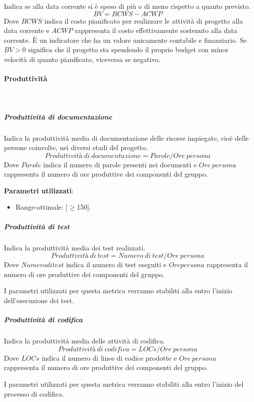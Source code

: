 			Indica se alla data corrente si è speso di più o di meno rispetto a quanto previsto.
			\[
			BV = BCWS - ACWP
			\]
			Dove $BCWS$ indica il costo pianificato per realizzare le attività di  progetto alla  data corrente e $ACWP$ rappresenta il costo effettivamente sostenuto alla data  corrente.
			È un indicatore che ha un valore unicamente contabile e finanziario. Se $BV>0$ significa che il progetto sta spendendo il proprio budget con minor velocità di quanto pianificato, viceversa se negativo.

			\paragraph{Produttività} \mbox{} \\

				\subparagraph{Produttività di documentazione}
				Indica la produttività media di documentazione delle risorse impiegate, cioè delle persone coinvolte, nei diversi stadi del progetto.
				\[
				Produttività\ di\ documentazione = Parole / Ore\ persona
				\]
				Dove $Parole$ indica il numero di parole presenti nei documenti e $Ore\ persona$ rappresenta il numero di ore produttive dei componenti del gruppo.
				
				\textbf{Parametri utilizzati}:
				\begin{itemize}
					\item Range-ottimale: [$\ge$150].
				\end{itemize}

				\subparagraph{Produttività di test}
				Indica la produttività media dei test realizzati.
				\[
				Produttività\ di\ test = Numero\ di\ test / Ore\ persona
				\]
				Dove $Numero di test$ indica il numero di test eseguiti e $Ore persona$ rappresenta il numero di ore produttive dei componenti del gruppo.
				
				I parametri utilizzati per questa metrica verranno stabiliti alla entro l'inizio dell'esecuzione dei test.

				\subparagraph{Produttività di codifica}
				Indica la produttività media delle attività di codifica.
				\[
				Produttività\ di\ codifica = LOCs / Ore\ persona
				\]
				Dove $LOCs$ indica il numero di linee di codice prodotte e $Ore\ persona$ rappresenta il numero di ore produttive dei componenti del gruppo.
				
				I parametri utilizzati per questa metrica verranno stabiliti alla entro l'inizio del processo di codifica.

